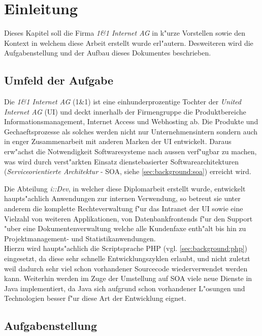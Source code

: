 \chapter{Einleitung}
\label{sec:intro}

Dieses Kapitel soll die Firma \emph{1\&1 Internet AG} in k"urze Vorstellen sowie
den Kontext in welchem diese Arbeit erstellt wurde erl"autern. Desweiteren wird 
die Aufgabenstellung und der Aufbau dieses Dokumentes beschrieben.

\section{Umfeld der Aufgabe}
\label{sec:intro:kontext}

Die \emph{1\&1 Internet AG} (1\&1) ist eine einhunderprozentige Tochter der 
\emph{United Internet AG} (UI) und deckt innerhalb der Firmengruppe die Produktbereiche Informationsmanagement,
Internet Access und Webhosting ab. Die Produkte und Gechaeftsprozesse als solches werden
nicht nur Unternehmensintern sondern auch in enger Zusammenarbeit mit anderen Marken
der UI entwickelt. Daraus erw"achst die Notwendigkeit Softwaresysteme nach aussen
verf"ugbar zu machen, was wird durch verst"arkten Einsatz dienstebasierter 
Softwarearchitekturen (\emph{Serviceorientierte Architektur} - SOA, siehe \ref{sec:background:soa}) erreicht wird.

Die Abteilung \emph{i::Dev}, in welcher diese Diplomarbeit erstellt wurde, entwickelt
haupts"achlich Anwendungen zur internen Verwendung, so betreut sie unter anderem 
die komplette Rechteverwaltung f"ur das Intranet der UI sowie eine Vielzahl von
weiteren Applikationen, von Datenbankfrontends f"ur den Support "uber eine Dokumentenverwaltung
welche alle Kundenfaxe enth"alt bis hin zu Projektmanagement- und Statistikanwendungen.\\
Hierzu wird haupts"achlich die Scriptsprache PHP (vgl. \ref{sec:background:php}) eingesetzt, da diese sehr schnelle 
Entwicklungszyklen erlaubt, und nicht zuletzt weil dadurch sehr viel schon vorhandener
Sourcecode wiederverwendet werden kann. Weiterhin werden im Zuge der Umstellung auf SOA viele neue 
Dienste in Java implementiert, da Java sich aufgrund schon vorhandener L"osungen und Technologien besser 
f"ur diese Art der Entwicklung eignet. 

\section{Aufgabenstellung}
\label{sec:intro:assignment}

